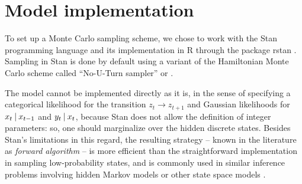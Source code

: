\documentclass[
  10pt, twocolumn, headings=normal,
  footlines=1, DIV=calc
]{scrartcl}
\begin{document}
\section{Model implementation}
To set up a Monte Carlo sampling scheme, we chose to work with the Stan
\autocite{Stan24} programming language and its implementation in R through the
package \textsf{rstan} \autocite{RStan24}. Sampling in Stan is done by default
using a variant of the Hamiltonian Monte Carlo scheme called \enquote{No-U-Turn
sampler} or  \autocite{Carpenter17}.

The model cannot be implemented directly as it is, in the sense of specifying a
categorical likelihood for the transition $z_{t} \to z_{t+1}$ and Gaussian
likelihoods for $x_{t} \:\vert\: x_{t-1}$ and $y_{t} \:\vert\: x_{t}$, be\-cause Stan
does not allow the definition of integer parameters: so, one should marginalize
over the hidden discrete states. Besides Stan’s limitations in this regard, the
resulting strategy -- known in the literature as \emph{forward algorithm} -- is
more efficient than the straightforward implementation in sampling
low-probability states, and is commonly used in similar inference problems
involving hidden Markov models or other state space models
\autocite{Damiano2018}.
\end{document}
